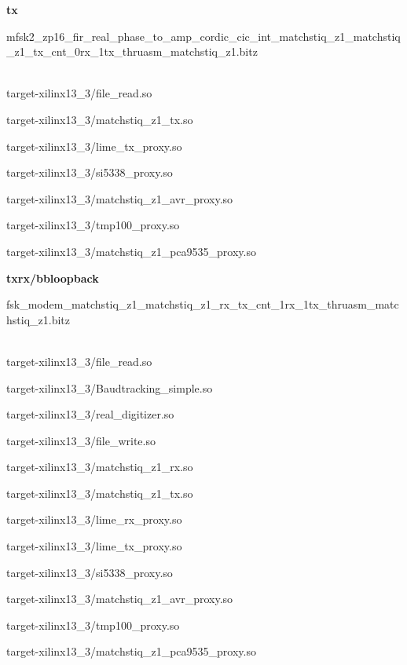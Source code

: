 \begin{appendices}
	\textbf{tx}
	\begin{itemize}
	\item
mfsk2\_zp16\_fir\_real\_phase\_to\_amp\_cordic\_cic\_int\_matchstiq\_z1\_matchstiq\_z1\_tx\_cnt\_0rx\_1tx\_thruasm\_matchstiq\_z1.bitz	\\ \\
	\begin{minipage}[t]{.5\textwidth}
	\item target-xilinx13\_3/file\_read.so
	\item target-xilinx13\_3/matchstiq\_z1\_tx.so
	\item target-xilinx13\_3/lime\_tx\_proxy.so
	\item target-xilinx13\_3/si5338\_proxy.so
	\end{minipage}
	\begin{minipage}[t]{.5\textwidth}
	\item target-xilinx13\_3/matchstiq\_z1\_avr\_proxy.so
	\item target-xilinx13\_3/tmp100\_proxy.so
	\item target-xilinx13\_3/matchstiq\_z1\_pca9535\_proxy.so
	\end{minipage}
	\end{itemize}

	\textbf{txrx/bbloopback}
	\begin{itemize}
	\item fsk\_modem\_matchstiq\_z1\_matchstiq\_z1\_rx\_tx\_cnt\_1rx\_1tx\_thruasm\_matchstiq\_z1.bitz \\ \\
	\begin{minipage}[t]{.5\textwidth}
	\item target-xilinx13\_3/file\_read.so
	\item target-xilinx13\_3/Baudtracking\_simple.so
	\item target-xilinx13\_3/real\_digitizer.so
	\item target-xilinx13\_3/file\_write.so
	\item target-xilinx13\_3/matchstiq\_z1\_rx.so
	\item target-xilinx13\_3/matchstiq\_z1\_tx.so
	\end{minipage}
	\begin{minipage}[t]{.5\textwidth}
	\item target-xilinx13\_3/lime\_rx\_proxy.so
	\item target-xilinx13\_3/lime\_tx\_proxy.so
	\item target-xilinx13\_3/si5338\_proxy.so
	\item target-xilinx13\_3/matchstiq\_z1\_avr\_proxy.so
	\item target-xilinx13\_3/tmp100\_proxy.so
	\item target-xilinx13\_3/matchstiq\_z1\_pca9535\_proxy.so
	\end{minipage}
	\end{itemize}


\end{appendices}
